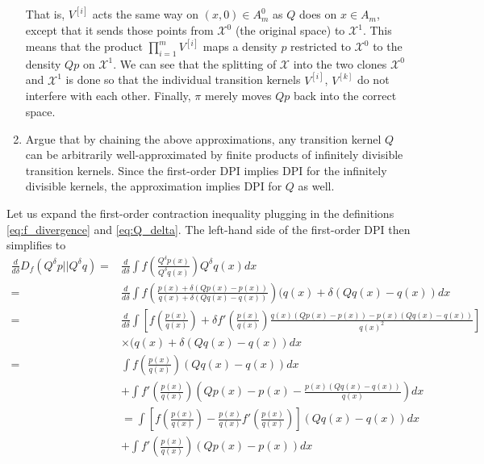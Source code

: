 \documentclass[12pt]{article}
\begin{document}
\begin{enumerate}
\[\]
That is, $V^{[i]}$ acts the same way on $(x,0) \in A_m^0$ as $Q$ does
on $x \in A_m$, except that it sends those points from $\mathcal{X}^0$
(the original space) to $\mathcal{X}^1$.  This means that the product
$\prod_{i=1}^m V^{[i]}$ maps a density $p$ restricted to
$\mathcal{X}^0$ to the density $Qp$ on $\mathcal{X}^1$.  We can see
that the splitting of $\mathcal{X}$ into the two clones
$\mathcal{X}^0$ and $\mathcal{X}^1$ is done so that the individual
transition kernels $V^{[i]}$, $V^{[k]}$ do not interfere with each
other.  Finally, $\pi$ merely moves $Qp$ back into the correct space.
\item 
Argue that by chaining the above approximations, any transition kernel
$Q$ can be arbitrarily well-approximated by finite products of
infinitely divisible transition kernels.  Since the first-order DPI
implies DPI for the infinitely divisible kernels, the approximation
implies DPI for $Q$ as well.
\end{enumerate}

Let us expand the first-order contraction inequality plugging in the
definitions \eqref{eq:f_divergence} and \eqref{eq:Q_delta}.  The left-hand side of the first-order DPI then simplifies to
\begin{align*}
\frac{d}{d\delta} D_f(Q^\delta p||Q^\delta q)
=& \frac{d}{d\delta}\int f\left(\frac{Q^\delta p(x)}{Q^\delta q(x)}\right) Q^\delta q(x) dx \\
=& \frac{d}{d\delta}\int f\left(\frac{p(x) + \delta(Qp(x) - p(x))}{q(x) + \delta(Qq(x) - q(x))}\right) (q(x) + \delta (Qq(x)-q(x)) dx \\
=& \frac{d}{d\delta}\int \left[f\left(\frac{p(x)}{q(x)}\right) + \delta f'\left(\frac{p(x)}{q(x)}\right) \frac{q(x)(Qp(x) - p(x)) - p(x) (Qq(x) - q(x))}{q(x)^2}\right]\\
&\times (q(x) + \delta (Qq(x)-q(x)) dx\\
=& \int f\left(\frac{p(x)}{q(x)}\right) (Qq(x)-q(x)) dx \\
&+ \int f'\left(\frac{p(x)}{q(x)}\right) \left(Qp(x) - p(x) - \frac{p(x) (Qq(x) - q(x))}{q(x)}\right)  dx
\\&=  \int \left[f\left(\frac{p(x)}{q(x)}\right) - \frac{p(x)}{q(x)}f'\left(\frac{p(x)}{q(x)}\right) \right] (Qq(x)-q(x)) dx\\
&+ \int f'\left(\frac{p(x)}{q(x)}\right) (Qp(x) - p(x))  dx
\end{align*}
\end{document}
